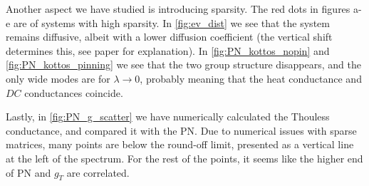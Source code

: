 Another aspect we have studied is introducing sparsity. The red dots in figures a-e 
are of systems with high sparsity. In \autoref{fig:ev_dist} we see that the 
system remains diffusive, albeit with a lower diffusion coefficient (the vertical
shift determines this, see paper
for explanation). In  \autoref{fig:PN_kottos_nopin} and \autoref{fig:PN_kottos_pinning}
we see that the two group structure disappears, and the only wide modes
are for $\lambda\rightarrow 0$, probably meaning that the heat conductance 
and $DC$ conductances coincide.


Lastly, in \autoref{fig:PN_g_scatter} we have
numerically calculated the Thouless conductance,
and compared it with the PN. Due to numerical issues
with sparse matrices, many points are below the round-off limit,
presented as a vertical line at the left of the spectrum. For the rest
of the points, it seems like the higher end of PN and $g_T$ are correlated.



